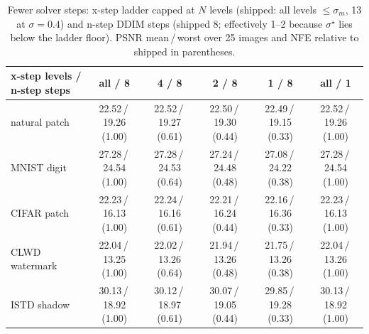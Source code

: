 \begin{table}[t]
\centering\small
\caption{Fewer solver steps: x-step ladder capped at $N$ levels (shipped: all levels $\le\sigma_m$, 13 at $\sigma{=}0.4$) and n-step DDIM steps (shipped 8; effectively 1--2 because $\sigma^\star$ lies below the ladder floor). PSNR mean\,/\,worst over 25 images and NFE relative to shipped in parentheses.}
\label{tab:ablation_steps}
\begin{tabular}{lccccc}
\toprule
x-step levels / n-step steps & all / 8 & 4 / 8 & 2 / 8 & 1 / 8 & all / 1 \\
\midrule
natural patch & 22.52\,/\,19.26 (1.00) & 22.52\,/\,19.27 (0.61) & 22.50\,/\,19.30 (0.44) & 22.49\,/\,19.15 (0.33) & 22.52\,/\,19.26 (1.00) \\
MNIST digit & 27.28\,/\,24.54 (1.00) & 27.28\,/\,24.53 (0.64) & 27.24\,/\,24.48 (0.48) & 27.08\,/\,24.22 (0.38) & 27.28\,/\,24.54 (1.00) \\
CIFAR patch & 22.23\,/\,16.13 (1.00) & 22.24\,/\,16.16 (0.61) & 22.21\,/\,16.24 (0.44) & 22.16\,/\,16.36 (0.33) & 22.23\,/\,16.13 (1.00) \\
CLWD watermark & 22.04\,/\,13.25 (1.00) & 22.02\,/\,13.26 (0.64) & 21.94\,/\,13.26 (0.48) & 21.75\,/\,13.26 (0.38) & 22.04\,/\,13.26 (1.00) \\
ISTD shadow & 30.13\,/\,18.92 (1.00) & 30.12\,/\,18.97 (0.61) & 30.07\,/\,19.05 (0.44) & 29.85\,/\,19.28 (0.33) & 30.13\,/\,18.92 (1.00) \\
\bottomrule
\end{tabular}
\end{table}

